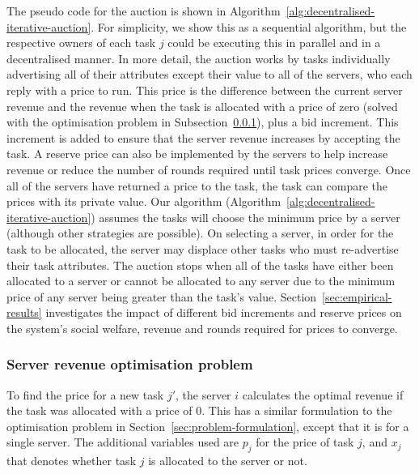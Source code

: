 The pseudo code for the auction is  shown in Algorithm~\ref{alg:decentralised-iterative-auction}. For simplicity, we show this as a sequential algorithm, but the respective owners of each task $j$ could be executing this in parallel and in a decentralised manner. In more detail, the auction  works by tasks individually advertising all of their attributes except their value to all of the servers, who each reply with a price to run. This price is the difference between the current server revenue and the revenue when the task is allocated with a price of zero (solved with the optimisation problem in Subsection~\ref{subsubsec:decentralised-iterative-problem}), plus a bid increment. This increment is added to ensure that the server revenue increases by accepting the task. A reserve price can also be implemented by the servers to help increase revenue or reduce the number of rounds required until task prices converge. Once all of the servers have returned a price to the task, the task can compare the prices with its private value. Our algorithm (Algorithm~\ref{alg:decentralised-iterative-auction}) assumes the tasks will choose the minimum price by a server (although other strategies are possible). On selecting a server, in order for the task to be allocated, the server may displace other tasks who must re-advertise their task attributes. The auction stops when all of the tasks have either been allocated to a server or cannot be allocated to any server due to the minimum price of any server being greater than the task's value. Section~\ref{sec:empirical-results} investigates the impact of different bid increments and reserve prices on the system's social welfare, revenue and rounds required for prices to converge. 

\subsubsection{Server revenue optimisation problem}
\label{subsubsec:decentralised-iterative-problem}
To find the price for a new task $j'$, the server $i$ calculates the optimal revenue if the task was allocated with a price of 0. This has a similar formulation to the optimisation problem in Section~\ref{sec:problem-formulation}, except that it is for a single server. The additional variables used are $p_j$ for the price of task $j$, and $x_j$ that denotes whether task $j$ is allocated to the server or not.

